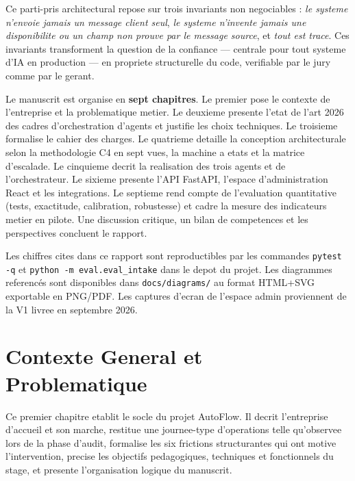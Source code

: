 \documentclass[12pt,a4paper,openany]{report}
\begin{document}
Ce parti-pris architectural repose sur trois invariants non negociables : \emph{le systeme n'envoie jamais un message client seul}, \emph{le systeme n'invente jamais une disponibilite ou un champ non prouve par le message source}, et \emph{tout est trace}. Ces invariants transforment la question de la confiance --- centrale pour tout systeme d'IA en production --- en propriete structurelle du code, verifiable par le jury comme par le gerant.

Le manuscrit est organise en \textbf{sept chapitres}. Le premier pose le contexte de l'entreprise et la problematique metier. Le deuxieme presente l'etat de l'art 2026 des cadres d'orchestration d'agents et justifie les choix techniques. Le troisieme formalise le cahier des charges. Le quatrieme detaille la conception architecturale selon la methodologie C4 en sept vues, la machine a etats et la matrice d'escalade. Le cinquieme decrit la realisation des trois agents et de l'orchestrateur. Le sixieme presente l'API FastAPI, l'espace d'administration React et les integrations. Le septieme rend compte de l'evaluation quantitative (tests, exactitude, calibration, robustesse) et cadre la mesure des indicateurs metier en pilote. Une discussion critique, un bilan de competences et les perspectives concluent le rapport.

\vspace{0.3cm}
\begin{infobox}
Les chiffres cites dans ce rapport sont reproductibles par les commandes \texttt{pytest -q} et \texttt{python -m eval.eval\_intake} dans le depot du projet. Les diagrammes referencés sont disponibles dans \texttt{docs/diagrams/} au format HTML+SVG exportable en PNG/PDF. Les captures d'ecran de l'espace admin proviennent de la V1 livree en septembre 2026.
\end{infobox}

\chapter{Contexte General et Problematique}\label{chap:contexte}
Ce premier chapitre etablit le socle du projet AutoFlow. Il decrit l'entreprise d'accueil et son marche, restitue une journee-type d'operations telle qu'observee lors de la phase d'audit, formalise les six frictions structurantes qui ont motive l'intervention, precise les objectifs pedagogiques, techniques et fonctionnels du stage, et presente l'organisation logique du manuscrit.
\end{document}
